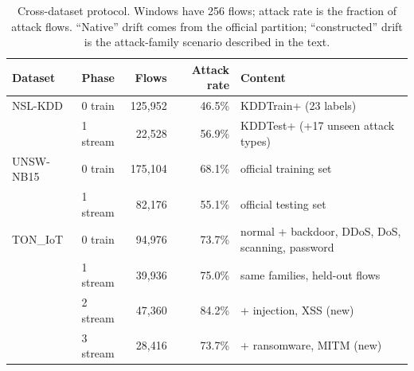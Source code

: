 \documentclass[twocolumn]{llncs}
\begin{document}
\begin{table}[!t]
\centering
\caption{Cross-dataset protocol. Windows have 256 flows; attack rate is the fraction of attack
flows. ``Native'' drift comes from the official partition; ``constructed'' drift is the
attack-family scenario described in the text.}
\label{tab:multi-data}
\small
\begin{tabular}{|l|l|r|r|l|}
\hline
Dataset & Phase & Flows & Attack rate & Content \\
\hline
NSL-KDD   & 0 train  & 125{,}952 & 46.5\% & KDDTrain+ (23 labels) \\
          & 1 stream &  22{,}528 & 56.9\% & KDDTest+ (+17 unseen attack types) \\
\hline
UNSW-NB15 & 0 train  & 175{,}104 & 68.1\% & official training set \\
          & 1 stream &  82{,}176 & 55.1\% & official testing set \\
\hline
TON\_IoT  & 0 train  &  94{,}976 & 73.7\% & normal + backdoor, DDoS, DoS, scanning, password \\
          & 1 stream &  39{,}936 & 75.0\% & same families, held-out flows \\
          & 2 stream &  47{,}360 & 84.2\% & + injection, XSS (new) \\
          & 3 stream &  28{,}416 & 73.7\% & + ransomware, MITM (new) \\
\hline
\end{tabular}
\end{table}
\end{document}
